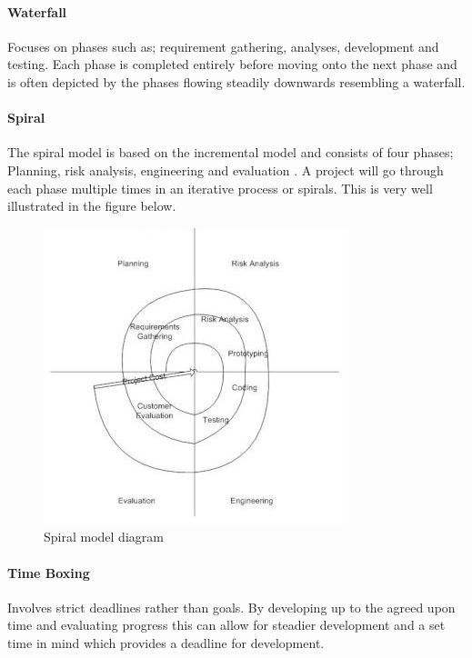 \paragraph{Waterfall}\label{waterfall}

Focuses on phases such as; requirement gathering, analyses, development
and testing. Each phase is completed entirely before moving onto the
next phase and is often depicted by the phases flowing steadily
downwards resembling a waterfall.

\paragraph{Spiral}\label{spiral}

The spiral model is based on the incremental model and consists of four
phases; Planning, risk analysis, engineering and evaluation
\parencite{spiral}. A project will go through each phase multiple times
in an iterative process or spirals. This is very well illustrated in the
figure below.

\begin{figure}[htbp]
\centering
\includegraphics{../../Images/Spiral-model.jpg}
\caption{Spiral model diagram \parencite{spiral}}
\end{figure}

\paragraph{Time Boxing}\label{time-boxing}

Involves strict deadlines rather than goals. By developing up to the
agreed upon time and evaluating progress this can allow for steadier
development and a set time in mind which provides a deadline for
development.

